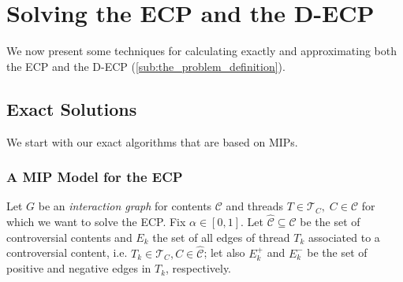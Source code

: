 \chapter{Solving the \acrshort{ECP} and the \acrshort{D-ECP}}
\label{ch:solving}




We now present some techniques for calculating exactly and approximating both
the \acrshort{ECP} and the \acrshort{D-ECP} (\autoref{sub:the_problem_definition}).

\section{Exact Solutions}%
\label{sec:exact-solutions}

We start with our exact algorithms that are based on MIPs.

\subsection{A MIP Model for the \acrshort{ECP}}%
\label{sub:a_mip_model_for_the_ecp}

Let $G$ be an \emph{interaction graph} for contents $\mathcal{C} $ and
threads $T \in \mathcal{T}_{C}, \; C \in \mathcal{C} $ for which we want to
solve the \acrshort{ECP}. Fix
$\alpha \in [0, 1]$. Let $\mathcal{\hat{C}} \subseteq \mathcal{C} $ be the
set of controversial contents and $E_k$ the set
of all edges of thread $T_k$ associated to a controversial content, i.e. $T_{k}
	\in \mathcal{T}_{C}, C \in \mathcal{\hat{C}}$; let also $E^{+}_k $
and $E^{-}_k $ be the set of positive and negative edges in $T_k$, respectively.

